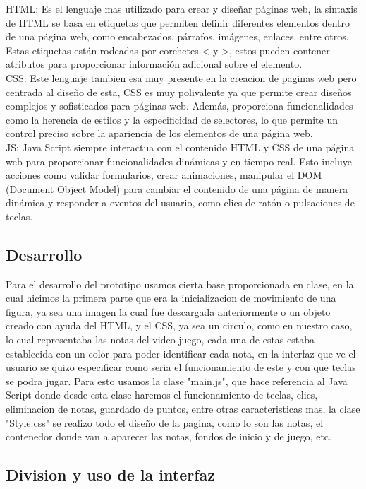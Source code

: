 \documentclass[conference]{IEEEtran}
\begin{document}
HTML: Es el lenguaje mas utilizado para crear y diseñar páginas web, la sintaxis de HTML se basa en etiquetas que permiten definir diferentes elementos dentro de una página web, como encabezados, párrafos, imágenes, enlaces, entre otros. Estas etiquetas están rodeadas por corchetes < y >, estos pueden contener atributos para proporcionar información adicional sobre el elemento.
\\
CSS: Este lenguaje tambien esa muy presente en la creacion de paginas web pero centrada al diseño de esta, CSS es muy polivalente ya que permite crear diseños complejos y sofisticados para páginas web. Además, proporciona funcionalidades como la herencia de estilos y la especificidad de selectores, lo que permite un control preciso sobre la apariencia de los elementos de una página web.
\\
JS: Java Script siempre interactua con el contenido HTML y CSS de una página web para proporcionar funcionalidades dinámicas y en tiempo real. Esto incluye acciones como validar formularios, crear animaciones, manipular el DOM (Document Object Model) para cambiar el contenido de una página de manera dinámica y responder a eventos del usuario, como clics de ratón o pulsaciones de teclas.
\subsection{Desarrollo}

Para el desarrollo del prototipo usamos cierta base proporcionada en clase, en la cual hicimos la primera parte que era la inicializacion de movimiento de una figura, ya sea una imagen la cual fue descargada anteriormente o un objeto creado con ayuda del HTML, y el CSS, ya sea un circulo, como en nuestro caso, lo cual representaba las notas del video juego, cada una de estas estaba establecida con un color para poder identificar cada nota, en la interfaz que ve el usuario se quizo especificar como seria el funcionamiento de este y con que teclas se podra jugar. Para esto usamos la clase "main.js", que hace referencia al Java Script donde desde esta clase haremos el funcionamiento de teclas, clics, eliminacion de notas, guardado de puntos, entre otras caracteristicas mas, la clase "Style.css" se realizo todo el diseño de la pagina, como lo son las notas, el contenedor donde van a aparecer las notas, fondos de inicio y de juego, etc. 

\subsection{Division y uso de la interfaz }
\end{document}
